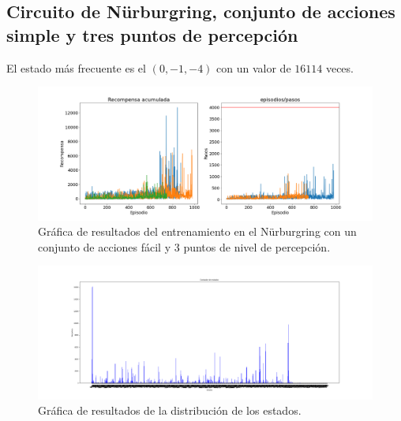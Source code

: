 \newpage
\subsection{Circuito de Nürburgring, conjunto de acciones simple y tres puntos de percepción}

El estado más frecuente es el  $(0, -1, -4)$ con un valor de $16114$ veces.

\begin{figure}[!ht]
    \centering \includegraphics[width=1\columnwidth]{./figures/anexos/nurburgring_simple_3.png}
    \caption{Gráfica de resultados del entrenamiento en el Nürburgring con un conjunto de acciones fácil y 3 puntos de nivel de percepción.}
\end{figure}

\begin{figure}[!ht]
    \centering \includegraphics[width=1\columnwidth]{./figures/anexos/states_counter_nurburgring_simple_3.png}
    \caption{Gráfica de resultados de la distribución de los estados.}
\end{figure}

